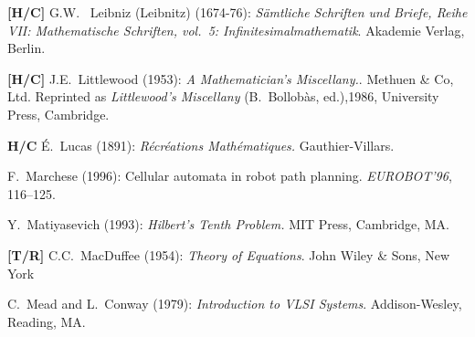 \begin{thebibliography}{999}

{\bf [H/C]}
G.W.~ Leibniz (Leibnitz) (1674-76):
{\it S\"{a}mtliche Schriften und Briefe, Reihe VII: Mathematische Schriften, vol.~5: Infinitesimalmathematik}.  Akademie Verlag, Berlin.


 


{\bf [H/C]}
J.E.~Littlewood (1953):
{\it A Mathematician's Miscellany.}. Methuen \& Co, Ltd.
Reprinted as {\it Littlewood's Miscellany} (B.~Bollob\`{a}s, ed.),1986, University Press, Cambridge.



{\bf H/C}
\'{E}.~Lucas (1891):
{\it R\'{e}cr\'{e}ations Math\'{e}matiques.}
Gauthier-Villars.


F.~Marchese (1996): Cellular automata in robot path planning.  {\it EUROBOT'96}, 116--125.

Y.~Matiyasevich (1993): {\it Hilbert's Tenth Problem.}  MIT Press, Cambridge, MA.

{\bf [T/R]}
C.C.~MacDuffee (1954): {\it Theory of Equations}.  John Wiley \& Sons, New York

C.~Mead and L.~Conway (1979):
{\it Introduction to VLSI Systems}.
Addison-Wesley, Reading, MA.%


\end{thebibliography}
